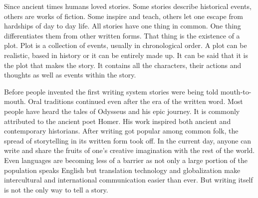 \label{chapter:introduction}
Since ancient times humans loved stories.
Some stories describe historical events, others are works of fiction.
Some inspire and teach, others let one escape from hardships of day to day life.
All stories have one thing in common.
One thing differentiates them from other written forms.
That thing is the existence of a plot.
Plot is a collection of events, usually in chronological order.
A plot can be realistic, based in history or it can be entirely made up.
It can be said that it is the plot that makes the story.
It contains all the characters, their actions and thoughts as well as events within the story.

Before people invented the first writing system stories were being told mouth-to-mouth.
Oral traditions continued even after the era of the written word.
Most people have heard the tales of Odysseus and his epic journey.
It is commonly attributed to the ancient poet Homer.
His work inspired both ancient and contemporary historians\cite{marincola2007odysseus}.
After writing got popular among common folk, the spread of storytelling in its written form took off.
In the current day, anyone can write and share the fruits of one's creative imagination with the rest of the world.
Even languages are becoming less of a barrier as not only a large portion of the population speaks English but translation technology and globalization make intercultural and international communication easier than ever\cite{coulmas1987speak}.
But writing itself is not the only way to tell a story.

